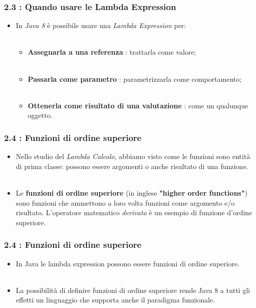 \documentclass{beamer}
\begin{document}
\begin{frame}
\frametitle{\textbf{2.3 : Quando usare le Lambda Expression}}
\begin{itemize}
	\item
	In \textit{Java 8} \`e possibile usare una \textit{Lambda Expression} per:\\\
	\begin{itemize}
		\item
		\textbf{Assegnarla a una referenza} : trattarla come valore;\\\
		\item
		\textbf{Passarla come parametro} : parametrizzarla come comportamento;\\\
		\item
		\textbf{Ottenerla come risultato di una valutazione} : come un qualunque oggetto.
	\end{itemize}
\end{itemize}
\end{frame}


\begin{frame}
	\frametitle{\textbf{2.4 : Funzioni di ordine superiore}}
	\begin{itemize}
		\item
			Nello studio del \textit{Lambda Calcolo}, abbiamo visto come le funzioni sono entità di prima classe: possono essere argomenti o anche risultato di una funzione.\\\
		\item
			Le \textbf{funzioni di ordine superiore} (in inglese \textbf{"higher order functions"}) sono funzioni che ammettono a loro volta funzioni come argomento e/o risultato. L'operatore matematico \emph{derivata} \`e un esempio di funzione d'ordine superiore.
	\end{itemize}
\end{frame}



\begin{frame}
	\frametitle{\textbf{2.4 : Funzioni di ordine superiore}}
\begin{itemize}
	\item
	In Java le lambda expression possono essere funzioni di ordine superiore.\\\
	\item
	La possibilit\`a di definire funzioni di ordine superiore rende Java 8 a tutti gli effetti un linguaggio che supporta anche il paradigma funzionale.
\end{itemize}
\end{frame}
\end{document}
